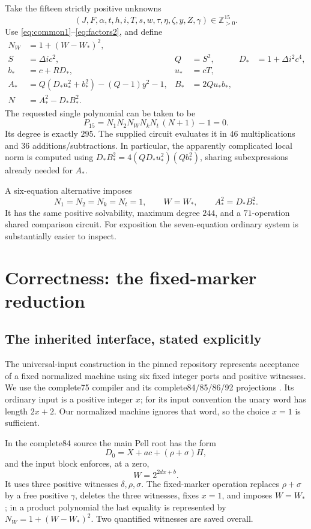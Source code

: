 \documentclass[11pt,a4paper]{article}
\theoremstyle{remark}
\newcommand{\Zp}{\mathbb Z_{>0}}
\newcommand{\nf}{N_1}
\newcommand{\nm}{N_2}
\newcommand{\nw}{N_W}
\newcommand{\nk}{N_k}
\newcommand{\nt}{N_t}
\begin{document}
Take the fifteen strictly positive unknowns
\[
 (J,F,\alpha,t,h,i,T,s,w,\tau,\eta,\zeta,y,Z,\gamma)\in\Zp^{15}.
\]
Use \eqref{eq:common1}--\eqref{eq:factors2}, and define
\begin{align}
 \nw&=1+(W-W_*)^2,\label{eq:markerfactor}\\
 S&=\Delta i c^2,& Q&=S^2,& D_*&=1+\Delta i^2c^4,\label{eq:elim1}\\
 b_*&=c+RD_*,& u_*&=cT,\label{eq:elim2}\\
 A_*&=Q(D_*u_*^2+b_*^2)-(Q-1)y^2-1,&
 B_*&=2Qu_*b_*,\label{eq:elim3}\\
 N&=A_*^2-D_*B_*^2.\label{eq:elim4}
\end{align}
The requested single polynomial can be taken to be
\begin{equation}
 \boxed{\quad P_{15}=\nf\nm\nw\nk\nt\,(N+1)-1=0.\quad}
\label{eq:P15}
\end{equation}
Its degree is exactly $295$. The supplied circuit evaluates it in
$46$ multiplications and $36$ additions/subtractions. In particular,
the apparently complicated local norm is computed using
$D_*B_*^2=4(QD_*u_*^2)(Qb_*^2)$, sharing subexpressions already needed
for $A_*$.

A six-equation alternative imposes
\[
 \nf=\nm=\nk=\nt=1,\qquad W=W_*,\qquad A_*^2=D_*B_*^2.
\]
It has the same positive solvability, maximum degree $244$, and a
$71$-operation shared comparison circuit. For exposition the
seven-equation ordinary system is substantially easier to inspect.

\section{Correctness: the fixed-marker reduction}
\label{sec:proof}

\subsection{The inherited interface, stated explicitly}

The universal-input construction in the pinned repository represents
acceptance of a fixed normalized machine using six fixed integer ports
and positive witnesses. We use the complete75 compiler and its
complete84/85/86/92 projections \cite{compiler,pell,projections}.
Its ordinary input is a positive integer $x$; for its input convention
the unary word has length $2x+2$. Our normalized machine ignores that
word, so the choice $x=1$ is sufficient.

In the complete84 source the main Pell root has the form
\[
 D_0=X+ac+(\rho+\sigma)H,
\]
and the input block enforces, at a zero,
\[
 W=2^{2dx+b}.
\]
It uses three positive witnesses $\delta,\rho,\sigma$. The fixed-marker
operation replaces $\rho+\sigma$ by a free positive $\gamma$, deletes
the three witnesses, fixes $x=1$, and imposes $W=W_*$; in a product
polynomial the last equality is represented by $\nw=1+(W-W_*)^2$.
Two quantified witnesses are saved overall.
\end{document}
